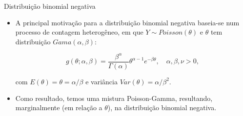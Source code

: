 \documentclass[10pt, aspectratio=169]{beamer}
\begin{document}


\begin{frame}{Distribuição binomial negativa} 

\begin{itemize}

\item A principal motivação para a distribuição binomial negativa baseia-se num processo de contagem heterogêneo, em que $Y \sim Poisson( \theta)$ e $\theta$ tem distribuição $Gama(\alpha, \beta):$

$$
g\left ( \theta;\alpha,\beta \right )=\frac{\beta^{\alpha}}{\Gamma\left ( \alpha \right )}\theta^{\alpha-1}e^{-\beta \theta},\quad \alpha, \beta, \nu>0,
$$

com $E(\theta)=\theta=\alpha /\beta$ e variância $Var(\theta)=\alpha /\beta^2.$

\vspace{0.5cm}

\item Como resultado, temos uma mistura Poisson-Gamma, resultando, marginalmente (em relação a $\theta$), na distribuição binomial negativa.


\end{itemize}

\end{frame}





\end{document}
